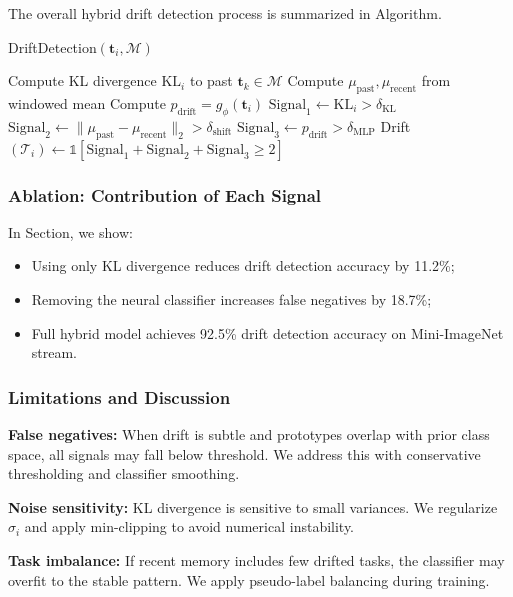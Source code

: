 \documentclass[conference]{IEEEtran}
\begin{document}
The overall hybrid drift detection process is summarized in Algorithm.

\begin{algorithm}[H]
\caption{DriftDetection$(\mathbf{t}_i, \mathcal{M})$}
\begin{algorithmic}[1]
\State Compute KL divergence $\text{KL}_i$ to past $\mathbf{t}_k \in \mathcal{M}$
\State Compute $\mu_{\text{past}}, \mu_{\text{recent}}$ from windowed mean
\State Compute $p_{\text{drift}} = g_\phi(\mathbf{t}_i)$
\State $\text{Signal}_1 \gets \text{KL}_i > \delta_{\mathrm{KL}}$
\State $\text{Signal}_2 \gets \|\mu_{\text{past}} - \mu_{\text{recent}}\|_2 > \delta_{\text{shift}}$
\State $\text{Signal}_3 \gets p_{\text{drift}} > \delta_{\text{MLP}}$
\State \Return Drift$(\mathcal{T}_i) \gets \mathbb{1}[\text{Signal}_1 + \text{Signal}_2 + \text{Signal}_3 \geq 2]$
\end{algorithmic}
\end{algorithm}

\subsubsection*{Ablation: Contribution of Each Signal}

In Section, we show:
\begin{itemize}
    \item Using only KL divergence reduces drift detection accuracy by 11.2\%;
    \item Removing the neural classifier increases false negatives by 18.7\%;
    \item Full hybrid model achieves 92.5\% drift detection accuracy on Mini-ImageNet stream.
\end{itemize}

\subsubsection*{Limitations and Discussion}

\textbf{False negatives:} When drift is subtle and prototypes overlap with prior class space, all signals may fall below threshold. We address this with conservative thresholding and classifier smoothing.

\textbf{Noise sensitivity:} KL divergence is sensitive to small variances. We regularize $\sigma_i$ and apply min-clipping to avoid numerical instability.

\textbf{Task imbalance:} If recent memory includes few drifted tasks, the classifier may overfit to the stable pattern. We apply pseudo-label balancing during training.
\end{document}
